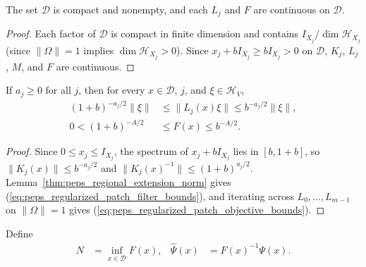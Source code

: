 \begin{lemma}
    \label{lem:peps_regularized_patch_compact_continuous}
    \leanok
    The set $\mathcal D$ is compact and nonempty, and each $L_j$ and $F$ are
    continuous on $\mathcal D$.
\end{lemma}
\begin{proof}
    \leanok
    Each factor of $\mathcal D$ is compact in finite dimension and contains
    $I_{X_j}/\dim\mathcal H_{X_j}$ (since $\|\Omega\|=1$ implies
    $\dim\mathcal H_{X_j}>0$). Since $x_j+bI_{X_j}\ge bI_{X_j}>0$ on $\mathcal D$,
    $K_j$, $L_j$, $M$, and $F$ are continuous.
\end{proof}

\begin{lemma}
    \label{thm:peps_regularized_patch_bounds}
    \leanok
    If $a_j\ge0$ for all $j$, then for every $x\in\mathcal D$, $j$, and
    $\xi\in\mathcal H_V$,
    \begin{align}
        (1+b)^{-a_j/2}\|\xi\|
         & \le\|L_j(x)\xi\|\le b^{-a_j/2}\|\xi\|,
        \label{eq:peps_regularized_patch_filter_bounds} \\
        0<(1+b)^{-A/2}
         & \le F(x)\le b^{-A/2}.
        \label{eq:peps_regularized_patch_objective_bounds}
    \end{align}
\end{lemma}
\begin{proof}
    \leanok
    Since $0\le x_j\le I_{X_j}$, the spectrum of $x_j+bI_{X_j}$ lies in
    $[b,1+b]$, so $\|K_j(x)\|\le b^{-a_j/2}$ and $\|K_j(x)^{-1}\|\le(1+b)^{a_j/2}$.
    Lemma~\ref{thm:peps_regional_extension_norm} gives
    (\ref{eq:peps_regularized_patch_filter_bounds}), and iterating across
    $L_0,\ldots,L_{m-1}$ on $\|\Omega\|=1$ gives
    (\ref{eq:peps_regularized_patch_objective_bounds}).
\end{proof}

\begin{definition}
    \label{def:peps_regularized_patch_minimum}
    \leanok
    Define
    \begin{align}
        N               & =\inf_{x\in\mathcal D}F(x), &
        \widehat\Psi(x) & =F(x)^{-1}\Psi(x).
        \label{eq:peps_regularized_patch_minimum_def}
    \end{align}
\end{definition}

